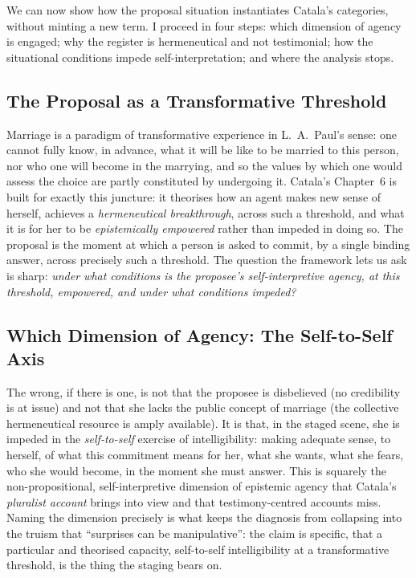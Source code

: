 We can now show how the proposal situation instantiates Catala's categories, without minting a new term. I proceed in four steps: which dimension of agency is engaged; why the register is hermeneutical and not testimonial; how the situational conditions impede self-interpretation; and where the analysis stops.

\subsection{The Proposal as a Transformative Threshold}\label{p06:sec:mapping}

Marriage is a paradigm of transformative experience in L.~A.\ Paul's sense: one cannot fully know, in advance, what it will be like to be married to this person, nor who one will become in the marrying, and so the values by which one would assess the choice are partly constituted by undergoing it. Catala's Chapter~6 is built for exactly this juncture: it theorises how an agent makes new sense of herself, achieves a \emph{hermeneutical breakthrough}, across such a threshold, and what it is for her to be \emph{epistemically empowered} rather than impeded in doing so. The proposal is the moment at which a person is asked to commit, by a single binding answer, across precisely such a threshold. The question the framework lets us ask is sharp: \emph{under what conditions is the proposee's self-interpretive agency, at this threshold, empowered, and under what conditions impeded?}

\subsection{Which Dimension of Agency: The Self-to-Self Axis}

The wrong, if there is one, is not that the proposee is disbelieved (no credibility is at issue) and not that she lacks the public concept of marriage (the collective hermeneutical resource is amply available). It is that, in the staged scene, she is impeded in the \emph{self-to-self} exercise of intelligibility: making adequate sense, to herself, of what this commitment means for her, what she wants, what she fears, who she would become, in the moment she must answer. This is squarely the non-propositional, self-interpretive dimension of epistemic agency that Catala's \emph{pluralist account} brings into view and that testimony-centred accounts miss. Naming the dimension precisely is what keeps the diagnosis from collapsing into the truism that ``surprises can be manipulative'': the claim is specific, that a particular and theorised capacity, self-to-self intelligibility at a transformative threshold, is the thing the staging bears on.

